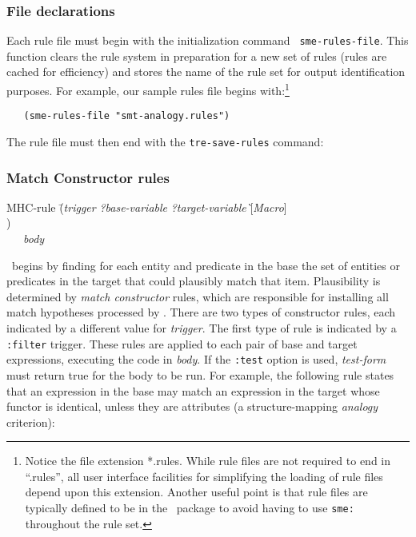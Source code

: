 \subsubsection{File declarations}

\indent
{}

Each rule file must begin with the initialization command {\tt
sme-rules-file}. This function clears the rule system in preparation for a
new set of rules (rules are cached for efficiency) and stores the name of
the rule set for output identification purposes. For example, our sample
rules file begins with:\footnote{Notice the file extension *.rules. While
rule files are not required to end in ``.rules'', all user interface
facilities for simplifying the loading of rule files depend upon this
extension. Another useful point is that rule files are typically defined to
be in the \SME\ package to avoid having to use {\tt sme:} throughout the
rule set.}  

\begin{verbatim}
   (sme-rules-file "smt-analogy.rules")
\end{verbatim}

\noindent
The rule file must then end with the {\tt tre-save-rules} command:


\subsubsection{Match Constructor rules}

\begin{tt}
\begin{tabbing}
MHC-rule \= ({\it trigger} \= {\it ?base-variable} {\it ?target-variable} \` [{\it Macro}] \\
         \>                ) \\
\ \ \  {\it body}
\end{tabbing}
\end{tt}

\SME\ begins by finding for each entity and predicate in the base the set of
entities or predicates in the target that could plausibly match that item.
Plausibility is determined by {\it match constructor} rules, which are
responsible for installing all match hypotheses processed by \SME.  There
are two types of constructor rules, each indicated by a different value for
{\it trigger}.  The first type of rule is indicated by a {\tt :filter}
trigger.  These rules are applied to each pair of base and target expressions,
executing the code in {\it body}.  If the {\tt :test} option is used,
{\it test-form} must return true for the body to be run.  For example, the
following rule states that an expression in the base may match an expression
in the target whose functor is identical, unless they are attributes
(a structure-mapping {\it analogy} criterion):


